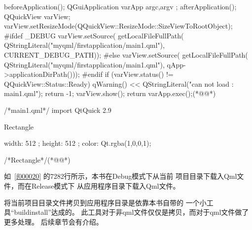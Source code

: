 \FloatBarrier
\begin{thebookfilesourceone}[escapeinside={(*@}{@*)},
label=f000020,
caption=GoodLuck,
title=\lstlistingname \thelstlisting
,firstnumber=67]
beforeApplication();
QGuiApplication varApp{ argc,argv };
afterApplication();
QQuickView varView;
varView.setResizeMode(QQuickView::ResizeMode::SizeViewToRootObject);
#ifdef _DEBUG
varView.setSource(
    getLocalFileFullPath(
        QStringLiteral("myqml/firstapplication/main1.qml"),
        CURRENT_DEBUG_PATH));
#else
varView.setSource(
    getLocalFileFullPath(
        QStringLiteral("myqml/firstapplication/main1.qml"),
        qApp->applicationDirPath()));
#endif
if (varView.status() != QQuickView::Status::Ready) {
    qWarning() << QStringLiteral("can not load : main1.qml");
    return -1;
}
varView.show();
return varApp.exec();(*@\marginpar[\hfill\setlength\fboxsep{2pt}\fbox{\footnotesize{\kaishu\parbox{1em}{\setlength{\baselineskip}{2pt}\lstlistingname}}\footnotesize{\thelstlisting}}]{\setlength\fboxsep{2pt}\fbox{\footnotesize{\kaishu\parbox{1em}{\setlength{\baselineskip}{2pt}\lstlistingname}}\footnotesize{\thelstlisting}}}@*)\end{thebookfilesourceone}          %
\FloatBarrier
\begin{thebookfilesourceone}[escapeinside={(*@}{@*)},
label=f000023,
caption=GoodLuck,
title=\lstlistingname \thelstlisting
]
/*main1.qml*/
import QtQuick 2.9

Rectangle{

    width: 512 ;
    height: 512 ;
    color: Qt.rgba(1,0,0,1);

}/*Rectangle*/(*@\marginpar[\hfill\setlength\fboxsep{2pt}\fbox{\footnotesize{\kaishu\parbox{1em}{\setlength{\baselineskip}{2pt}\lstlistingname}}\footnotesize{\thelstlisting}}]{\setlength\fboxsep{2pt}\fbox{\footnotesize{\kaishu\parbox{1em}{\setlength{\baselineskip}{2pt}\lstlistingname}}\footnotesize{\thelstlisting}}}@*)\end{thebookfilesourceone}          %

如\lstlistingname\ \ref{f000020}
的72\raisebox{0.16ex}{\sourcefonttwo\~{}}82行所示，本书在Debug模式下从当前
项目目录下载入Qml文件，而在Release模式下
从应用程序目录下载入Qml文件。

将当前项目目录文件拷贝到应用程序目录是依靠本书自带的
一个小工具“build\underline{\hspace{0.5em}}install”达成的。
此工具对于非qml文件仅仅是拷贝，而对于qml文件做了更多处理。
后续章节会有介绍。

